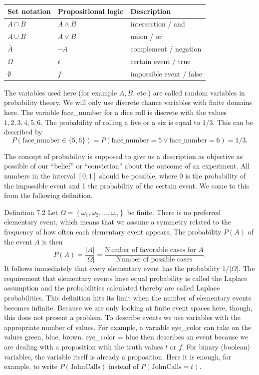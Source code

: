 \documentclass[10pt]{book}
\begin{document}
\begin{center}
\begin{tabular}{|l|l|l|}
\hline
Set notation & Propositional logic & Description \\
\hline
$A \cap B$ & $A \wedge B$ & intersection / and \\
\hline
$A \cup B$ & $A \vee B$ & union / or \\
\hline
$\bar{A}$ & $\neg A$ & complement / negation \\
\hline
$\Omega$ & $t$ & certain event / true \\
\hline
$\emptyset$ & $f$ & impossible event / false \\
\hline
\end{tabular}
\end{center}

The variables used here (for example $A, B$, etc.) are called random variables in probability theory. We will only use discrete chance variables with finite domains here. The variable face\_number for a dice roll is discrete with the values $1,2,3,4,5,6$. The probability of rolling a five or a six is equal to $1/3$. This can be described by
$$
P(\text{face\_number} \in \{5,6\})=P(\text{face\_number}=5 \vee \text{face\_number}=6)=1/3 .
$$

The concept of probability is supposed to give us a description as objective as possible of our “belief” or “conviction” about the outcome of an experiment. All numbers in the interval $[0,1]$ should be possible, where 0 is the probability of the impossible event and 1 the probability of the certain event. We come to this from the following definition.

Definition 7.2 Let $\Omega=\left\{\omega_{1}, \omega_{2}, \ldots, \omega_{n}\right\}$ be finite. There is no preferred elementary event, which means that we assume a symmetry related to the frequency of how often each elementary event appears. The probability $P(A)$ of the event $A$ is then
$$
P(A)=\frac{|A|}{|\Omega|}=\frac{\text{Number of favorable cases for } A}{\text{Number of possible cases}} .
$$
It follows immediately that every elementary event has the probability $1/|\Omega|$. The requirement that elementary events have equal probability is called the Laplace assumption and the probabilities calculated thereby are called Laplace probabilities. This definition hits its limit when the number of elementary events becomes infinite. Because we are only looking at finite event spaces here, though, this does not present a problem. To describe events we use variables with the appropriate number of values. For example, a variable eye\_color can take on the values green, blue, brown. eye\_color = blue then describes an event because we are dealing with a proposition with the truth values $t$ or $f$. For binary (boolean) variables, the variable itself is already a proposition. Here it is enough, for example, to write $P(\text{JohnCalls})$ instead of $P(\text{JohnCalls}=t)$.
\end{document}
